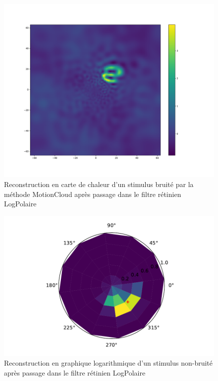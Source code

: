 \begin{figure}[th]
\centering
\includegraphics[scale=0.4]{Figures/mnist_128_LP_MotionCloud}
\decoRule
\caption[Figure]{Reconstruction en carte de chaleur d'un stimulus bruité par la méthode MotionCloud après passage dans le filtre rétinien LogPolaire}
\label{fig:mnist_128_LP_MotionCloud}
\end{figure}

\begin{figure}[th]
\centering
\includegraphics[scale=0.4]{Figures/mnist_log_nonoise}
\decoRule
\caption[Figure]{Reconstruction en graphique logarithmique d'un stimulus non-bruité après passage dans le filtre rétinien LogPolaire}
\label{fig:mnist_log_nonoise}
\end{figure}

